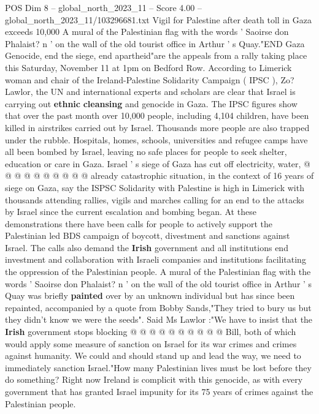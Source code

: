 \begin{textsample}{POS Dim 8 – global\_north\_2023\_11 – Score 4.00 – global\_north\_2023\_11/103296681.txt}  \label{ex:f8_pos_187}
Vigil for Palestine after death toll in Gaza exceeds 10,000 A mural of the Palestinian flag with the words ' Saoirse don Phalaist? n ' on the wall of the old tourist office in Arthur ' s Quay."END Gaza Genocide, end the siege, end apartheid"are the appeals from a rally taking place this Saturday, November 11 at 1pm on Bedford Row.
According to Limerick woman and chair of the Ireland-Palestine Solidarity Campaign ( IPSC ), Zo?
Lawlor, the UN and international experts and scholars are clear that Israel is carrying out \textbf{ethnic} \textbf{cleansing} and genocide in Gaza.
The IPSC figures show that over the past month over 10,000 people, including 4,104 children, have been killed in airstrikes carried out by Israel.
Thousands more people are also trapped under the rubble.
Hospitals, homes, schools, universities and refugee camps have all been bombed by Israel, leaving no safe places for people to seek shelter, education or care in Gaza.
Israel ' s siege of Gaza has cut off electricity, water, @ @ @ @ @ @ @ @ @ @ already catastrophic situation, in the context of 16 years of siege on Gaza, say the ISPSC Solidarity with Palestine is high in Limerick with thousands attending rallies, vigils and marches calling for an end to the attacks by Israel since the current escalation and bombing began.
At these demonstrations there have been calls for people to actively support the Palestinian led BDS campaign of boycott, divestment and sanctions against Israel.
The calls also demand the \textbf{Irish} government and all institutions end investment and collaboration with Israeli companies and institutions facilitating the oppression of the Palestinian people.
A mural of the Palestinian flag with the words ' Saoirse don Phalaist? n ' on the wall of the old tourist office in Arthur ' s Quay was briefly \textbf{painted} over by an unknown individual but has since been repainted, accompanied by a quote from Bobby Sands,"They tried to bury us but they didn't know we were the seeds".
Said Ms Lawlor :"We have to insist that the \textbf{Irish} government stops blocking @ @ @ @ @ @ @ @ @ @ Bill, both of which would apply some measure of sanction on Israel for its war crimes and crimes against humanity.
We could and should stand up and lead the way, we need to immediately sanction Israel."How many Palestinian lives must be lost before they do something?
Right now Ireland is complicit with this genocide, as with every government that has granted Israel impunity for its 75 years of crimes against the Palestinian people.

\end{textsample}
